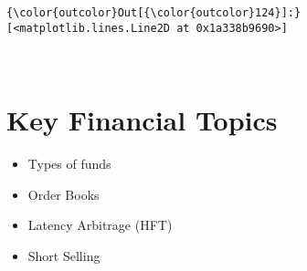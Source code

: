 \documentclass[11pt]{article}
\providecommand{\tightlist}{%
      \setlength{\itemsep}{0pt}\setlength{\parskip}{0pt}}
\begin{document}
\begin{Verbatim}[commandchars=\\\{\}]
{\color{outcolor}Out[{\color{outcolor}124}]:} [<matplotlib.lines.Line2D at 0x1a338b9690>]
\end{Verbatim}
            
    \begin{center}
    \end{center}
    { \hspace*{\fill} \\}
    
    \section{Key Financial Topics}\label{key-financial-topics}

\begin{itemize}
\tightlist
\item
  Types of funds
\item
  Order Books
\item
  Latency Arbitrage (HFT)
\item
  Short Selling
\end{itemize}


    
    
    
    
\end{document}
